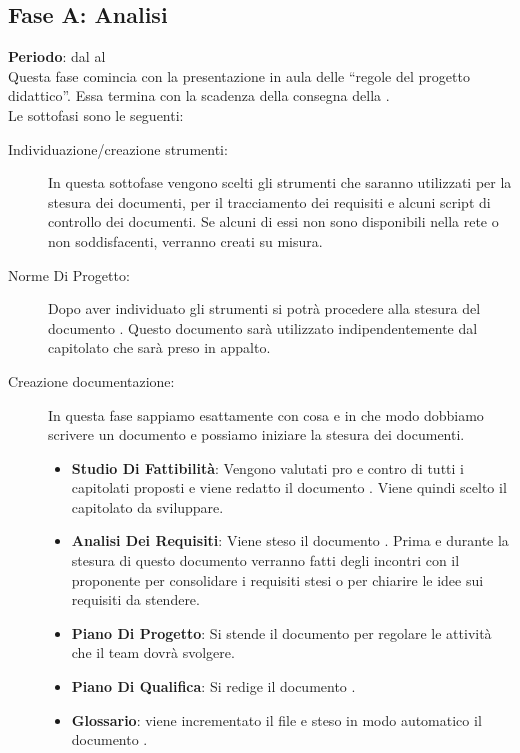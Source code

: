 \subsection{Fase A: Analisi}
	\textbf{Periodo}: dal  al  \\
	Questa fase comincia con la presentazione in aula delle “regole del progetto didattico”. Essa termina con la scadenza della consegna della .\\Le sottofasi sono le seguenti:
	\begin{description}
		\item[Individuazione/creazione strumenti:] In questa sottofase vengono scelti gli strumenti che saranno utilizzati per la stesura dei documenti, per il tracciamento dei requisiti e alcuni script di controllo dei documenti. Se alcuni di essi non sono disponibili nella rete o non soddisfacenti, verranno creati su misura.
		\item[Norme Di Progetto:] Dopo aver individuato gli strumenti si potrà procedere alla stesura del documento . Questo documento sarà utilizzato indipendentemente dal capitolato che sarà preso in appalto.
		\item[Creazione documentazione:] In questa fase sappiamo esattamente con cosa e in che modo dobbiamo scrivere un documento e possiamo iniziare la stesura dei documenti.
			\begin{itemize}
				\item \textbf{Studio Di Fattibilità}: Vengono valutati pro e contro di tutti i capitolati proposti e viene redatto il documento . Viene quindi scelto il capitolato da sviluppare.
				\item \textbf{Analisi Dei Requisiti}: Viene steso il documento . Prima e durante la stesura di questo documento verranno fatti degli incontri con il proponente per consolidare i requisiti stesi o per chiarire le idee sui requisiti da stendere.
				\item \textbf{Piano Di Progetto}: Si stende il documento  per regolare le attività che il team dovrà svolgere.
				\item \textbf{Piano Di Qualifica}: Si redige il documento .
				\item \textbf{Glossario}: viene incrementato il file   e steso in modo automatico il documento .
			\end{itemize}
	\end{description}
